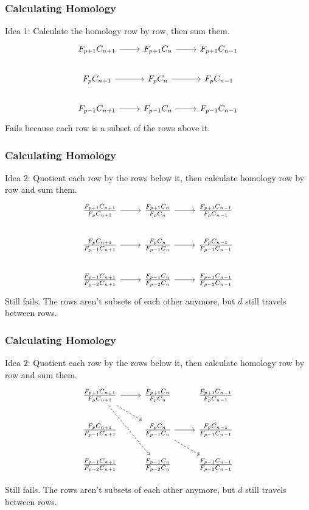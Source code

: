 \documentclass{beamer}
\begin{document}
\begin{frame}[fragile]
	\frametitle{Calculating Homology}

	Idea 1: Calculate the homology row by row, then sum them.
	\[
        \begin{tikzcd}
                F_{p+1}C_{n+1}\rar&F_{p+1}C_{n}\rar&F_{p+1}C_{n-1}\\
                F_{p}C_{n+1}\rar&F_{p}C_{n}\rar&F_{p}C_{n-1}\\
                F_{p-1}C_{n+1}\rar&F_{p-1}C_{n}\rar&F_{p-1}C_{n-1}
        \end{tikzcd}
        \]
	\onslide<2> Fails because each row is a subset of the rows above it.
\end{frame}

\begin{frame}[fragile]
	\frametitle{Calculating Homology}

	Idea 2: Quotient each row by the rows below it, then calculate homology row by row and sum them.
	\[
	\begin{tikzcd}
		\frac{F_{p+1}C_{n+1}}{F_{p}C_{n+1}}\rar&\frac{F_{p+1}C_{n}}{F_{p}C_{n}}\rar&\frac{F_{p+1}C_{n-1}}{F_{p}C_{n-1}}\\
		\frac{F_{p}C_{n+1}}{F_{p-1}C_{n+1}}\rar&\frac{F_{p}C_{n}}{F_{p-1}C_{n}}\rar&\frac{F_{p}C_{n-1}}{F_{p-1}C_{n-1}}\\
		\frac{F_{p-1}C_{n+1}}{F_{p-2}C_{n+1}}\rar&\frac{F_{p-1}C_{n}}{F_{p-2}C_{n}}\rar&\frac{F_{p-1}C_{n-1}}{F_{p-2}C_{n-1}}
        \end{tikzcd}
	\] 
	{\color{white}Still fails. The rows aren't subsets of each other anymore, but $d$ still travels between rows.}
\end{frame}

\begin{frame}[fragile]
	\frametitle{Calculating Homology}

	Idea 2: Quotient each row by the rows below it, then calculate homology row by row and sum them.
	\[
		\begin{tikzcd}
			\frac{F_{p+1}C_{n+1}}{F_{p}C_{n+1}}\rar\arrow[rd,dashed]\arrow[rdd,dashed]&\frac{F_{p+1}C_{n}}{F_{p}C_{n}}&\frac{F_{p+1}C_{n-1}}{F_{p}C_{n-1}}\\
			\frac{F_{p}C_{n+1}}{F_{p-1}C_{n+1}}&\frac{F_{p}C_{n}}{F_{p-1}C_{n}}\rar\arrow[rd,dashed]&\frac{F_{p}C_{n-1}}{F_{p-1}C_{n-1}}\\
			\frac{F_{p-1}C_{n+1}}{F_{p-2}C_{n+1}}&\frac{F_{p-1}C_{n}}{F_{p-2}C_{n}}&\frac{F_{p-1}C_{n-1}}{F_{p-2}C_{n-1}}
		\end{tikzcd}
        \]

	Still fails. The rows aren't subsets of each other anymore, but $d$ still travels between rows.
\end{frame}
\end{document}
